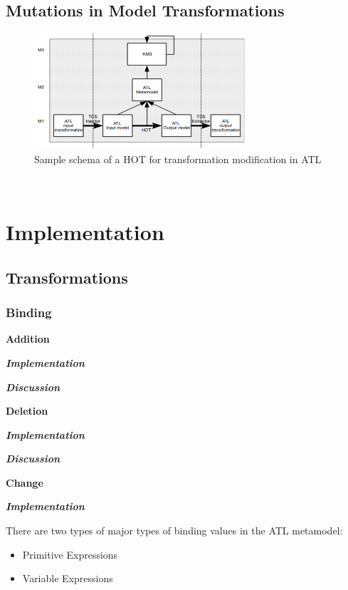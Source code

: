 \documentclass{llncs}
\begin{document}
\subsection{Mutations in Model Transformations}

\begin{figure}[tb]
	\centering
	\includegraphics[width=0.7\textwidth,natwidth=610,natheight=642]{figures/HOT.png}
	\caption{Sample schema of a HOT for transformation modification in ATL}
	\label{fig:samplefigure_pdf}
\end{figure}~\cite{misc:ModelingLanguages}

\section{Implementation}

\subsection{Transformations}

\subsubsection{Binding}

\textbf{Addition}

\textbf\textit{{Implementation}}

\textbf\textit{{Discussion}}

\textbf{Deletion}

\textbf\textit{{Implementation}}

\textbf\textit{{Discussion}}

\textbf{Change}

\textbf\textit{{Implementation}}

There are two types of major types of binding values in the ATL metamodel:

\begin{itemize}
	\item Primitive Expressions
	\item Variable Expressions
\end{itemize}
\end{document}
